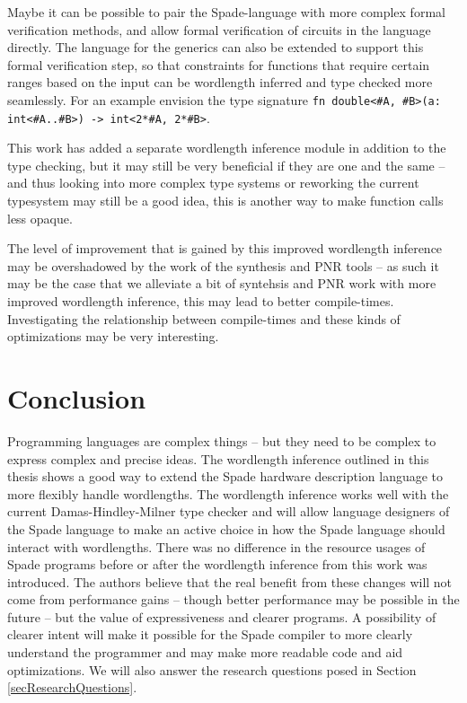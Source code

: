 Maybe it can be possible to pair the Spade-language with more complex formal verification methods, and allow formal verification of circuits in the language directly. The language for the generics can also be extended to support this formal verification step, so that constraints for functions that require certain ranges based on the input can be wordlength inferred and type checked more seamlessly. For an example envision the type signature \verb+fn double<#A, #B>(a: int<#A..#B>) -> int<2*#A, 2*#B>+.

This work has added a separate wordlength inference module in addition to the type checking, but it may still be very beneficial if they are one and the same -- and thus looking into more complex type systems or reworking the current typesystem may still be a good idea, this is another way to make function calls less opaque.

The level of improvement that is gained by this improved wordlength inference may be overshadowed by the work of the synthesis and PNR tools -- as such it may be the case that we alleviate a bit of syntehsis and PNR work with more improved wordlength inference, this may lead to better compile-times. Investigating the relationship between compile-times and these kinds of optimizations may be very interesting.


\chapter{Conclusion}
\label{cha:Conclusion}
Programming languages are complex things -- but they need to be complex to express complex and precise ideas. The wordlength inference outlined in this thesis shows a good way to extend the Spade hardware description language to more flexibly handle wordlengths. The wordlength inference works well with the current Damas-Hindley-Milner type checker and will allow language designers of the Spade language to make an active choice in how the Spade language should interact with wordlengths. There was no difference in the resource usages of Spade programs before or after the wordlength inference from this work was introduced. The authors believe that the real benefit from these changes will not come from performance gains -- though better performance may be possible in the future -- but the  value of expressiveness and clearer programs. A possibility of clearer intent will make it possible for the Spade compiler to more clearly understand the programmer and may make more readable code and aid optimizations. We will also answer the research questions posed in Section \ref{secResearchQuestions}.


